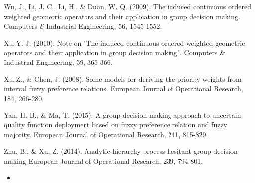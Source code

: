 \documentclass[10pt]{article}
\begin{document}
Wu, J., Li, J. C., Li, H., \& Duan, W. Q. (2009). The induced continuous ordered weighted geometric operators and their application in group decision making. Computers $\mathcal{E}$ Industrial Engineering, 56, 1545-1552.

$\mathrm{Xu}, \mathrm{Y}$. J. (2010). Note on "The induced continuous ordered weighted geometric operators and their application in group decision making". Computers \& Industrial Engineering, 59, 365-366.

$\mathrm{Xu}, \mathrm{Z.}$, \& Chen, J. (2008). Some models for deriving the priority weights from interval fuzzy preference relations. European Journal of Operational Research, 184, 266-280.

Yan, H. B., \& Ma, T. (2015). A group decision-making approach to uncertain quality function deployment based on fuzzy preference relation and fuzzy majority. European Journal of Operational Research, 241, 815-829.

Zhu, B., \& Xu, Z. (2014). Analytic hierarchy process-hesitant group decision making European Journal of Operational Research, 239, 794-801.

\begin{itemize}
  \item 
\end{itemize}
\end{document}
